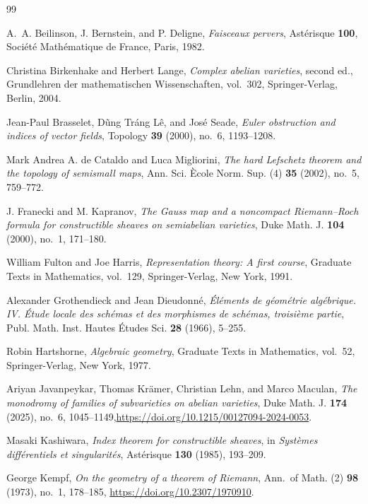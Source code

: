 \documentclass[10pt]{amsart}
\numberwithin{equation}{section}
\theoremstyle{definition}
\theoremstyle{remark}
\begin{document}
\begin{thebibliography}{99}

A.~A. Beilinson, J. Bernstein, and P. Deligne,
\emph{Faisceaux pervers}, Ast\'erisque \textbf{100}, Soci\'et\'e Math\'ematique de France, Paris, 1982.

Christina Birkenhake and Herbert Lange,
\emph{Complex abelian varieties}, second ed., Grundlehren der mathematischen Wissenschaften, vol.~302, Springer-Verlag, Berlin, 2004.

Jean-Paul Brasselet, D\~ung Tr\'ang L\^e, and Jos\'e Seade,
\emph{Euler obstruction and indices of vector fields}, Topology \textbf{39} (2000), no.~6, 1193--1208.

Mark Andrea A. de Cataldo and Luca Migliorini,
\emph{The hard Lefschetz theorem and the topology of semismall maps}, Ann. Sci. \`Ecole Norm. Sup. (4) \textbf{35} (2002), no.~5, 759--772.

J. Franecki and M. Kapranov,
\emph{The Gauss map and a noncompact Riemann--Roch formula for constructible sheaves on semiabelian varieties}, Duke Math. J. \textbf{104} (2000), no.~1, 171--180.

William Fulton and Joe Harris,
\emph{Representation theory: A first course}, Graduate Texts in Mathematics, vol.~129, Springer-Verlag, New York, 1991.

Alexander Grothendieck and Jean Dieudonn\'e,
\emph{\'El\'ements de g\'eom\'etrie alg\'ebrique. IV. \'Etude locale des sch\'emas et des morphismes de sch\'emas, troisi\`eme partie}, Publ. Math. Inst. Hautes \'Etudes Sci. \textbf{28} (1966), 5--255.

Robin Hartshorne,
\emph{Algebraic geometry}, Graduate Texts in Mathematics, vol.~52, Springer-Verlag, New York, 1977.

Ariyan Javanpeykar, Thomas Kr\"amer, Christian Lehn, and Marco Maculan,
\emph{The monodromy of families of subvarieties on abelian varieties}, Duke Math. J. \textbf{174} (2025), no.~6, 1045--1149,\newblock \url{https://doi.org/10.1215/00127094-2024-0053}.

Masaki Kashiwara,
\emph{Index theorem for constructible sheaves}, in \emph{Syst\`emes diff\'erentiels et singularit\'es}, Ast\'erisque \textbf{130} (1985), 193--209.

George Kempf,
\emph{On the geometry of a theorem of Riemann}, Ann.\ of Math. (2) \textbf{98} (1973), no.~1, 178--185,
\newblock \url{https://doi.org/10.2307/1970910}.


\end{thebibliography}
\end{document}
